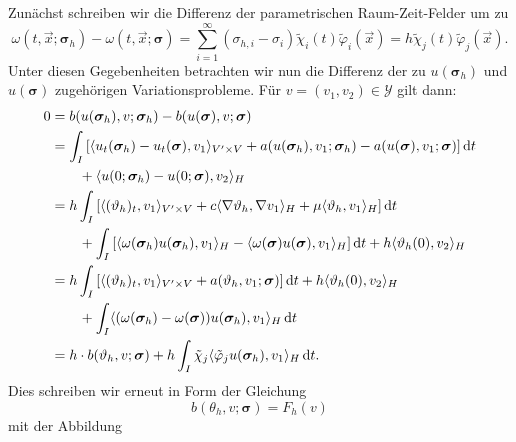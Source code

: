 \documentclass[../main.tex]{subfiles}
\begin{document}
\begin{Satz}
\begin{Beweis}
        Zunächst schreiben wir die Differenz der parametrischen Raum-Zeit-Felder um zu
        \begin{equation}
            \omega(t, \vec{x}; \bm\sigma_{h}) - \omega(t, \vec{x}; \bm\sigma)
            = \sum_{i = 1}^{\infty} (\sigma_{h,i} - \sigma_{i} ) \tilde{\chi}_{i}(t) \tilde{\varphi}_{i}(\vec{x})
            = h \tilde{\chi}_{j}(t) \tilde{\varphi}_{j}(\vec{x}).
        \end{equation}
        Unter diesen Gegebenheiten betrachten wir nun die Differenz der zu $u(\bm\sigma_{h})$ und $u(\bm\sigma)$ zugehörigen Variationsprobleme.
        Für $v = (v_{1}, v_{2}) \in \mathcal Y$ gilt dann:
        \begin{align}
            0
            &= b(u(\bm\sigma_{h}), v; \bm\sigma_{h}) - b(u(\bm\sigma), v; \bm\sigma)
            \\&= \int_{I} \left[ \langle u_{t}(\bm\sigma_{h}) - u_{t}(\bm\sigma),v_{1}\rangle_{V' \times V} + a(u(\bm\sigma_{h}), v_{1}; \bm\sigma_{h}) - a(u(\bm\sigma), v_{1}; \bm\sigma) \right] \mathop{}\!\mathrm{d} t
            \\&\qquad + \langle u(0; \bm\sigma_{h}) - u(0; \bm\sigma),v_{2}\rangle_{H}
            \\&=  h \int_{I} \left[ \langle(\vartheta_{h})_{t},v_{1}\rangle_{V' \times V} + c\langle\nabla \vartheta_{h},\nabla v_{1}\rangle_{H}  +  \mu \langle\vartheta_{h},v_{1}\rangle_{H} \right] \mathop{}\!\mathrm{d} t
            \\&\qquad + \int_{I} \left[ \langle\omega(\bm\sigma_{h}) u(\bm\sigma_{h}),v_{1}\rangle_{H} - \langle\omega(\bm\sigma) u(\bm\sigma),v_{1}\rangle_{H}  \right] \mathop{}\!\mathrm{d} t + h \langle\vartheta_{h}(0),v_{2}\rangle_{H}
            \\&= h \int_{I} \left[ \langle(\vartheta_{h})_{t},v_{1}\rangle_{V' \times V} + a(\vartheta_{h}, v_{1}; \bm\sigma)  \right] \mathop{}\!\mathrm{d} t + h \langle\vartheta_{h}(0),v_{2}\rangle_{H}
            \\&\qquad +\int_{I} \langle(\omega(\bm\sigma_{h}) - \omega(\bm\sigma))u(\bm\sigma_{h}),v_{1}\rangle_{H} \mathop{}\!\mathrm{d} t
            \\&= h \cdot b(\vartheta_{h}, v; \bm\sigma) + h \int_{I} \tilde{\chi}_{j} \langle\tilde{\varphi}_{j} u(\bm\sigma_{h}),v_{1}\rangle_{H} \mathop{}\!\mathrm{d} t.
        \end{align}
        Dies schreiben wir erneut in Form der Gleichung
        \begin{equation}
            \label{eq:existenz_partieller_ableitungen:beweis:variationsproblem}
            b(\theta_{h}, v; \bm\sigma) = F_{h}(v)
        \end{equation}
        mit der Abbildung
        \begin{equation}

\end{equation}
\end{Beweis}
\end{Satz}
\end{document}
